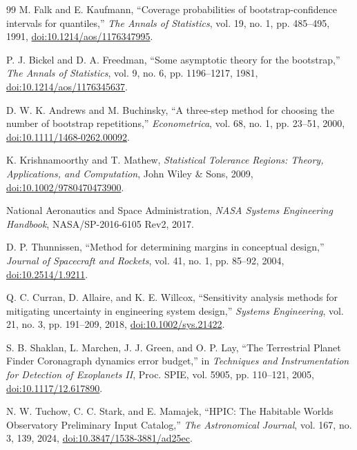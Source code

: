 \documentclass[12pt,a4paper]{article}
\numberwithin{equation}{section}
\numberwithin{figure}{section}
\numberwithin{table}{section}
\begin{document}
\begin{thebibliography}{99}
M. Falk and E. Kaufmann,
``Coverage probabilities of bootstrap-confidence intervals for quantiles,''
\textit{The Annals of Statistics}, vol. 19, no. 1, pp. 485--495, 1991,
\href{https://doi.org/10.1214/aos/1176347995}{doi:10.1214/aos/1176347995}.

P. J. Bickel and D. A. Freedman,
``Some asymptotic theory for the bootstrap,''
\textit{The Annals of Statistics}, vol. 9, no. 6, pp. 1196--1217, 1981,
\href{https://doi.org/10.1214/aos/1176345637}{doi:10.1214/aos/1176345637}.

D. W. K. Andrews and M. Buchinsky,
``A three-step method for choosing the number of bootstrap repetitions,''
\textit{Econometrica}, vol. 68, no. 1, pp. 23--51, 2000,
\href{https://doi.org/10.1111/1468-0262.00092}{doi:10.1111/1468-0262.00092}.

K. Krishnamoorthy and T. Mathew,
\textit{Statistical Tolerance Regions: Theory, Applications, and Computation},
John Wiley \& Sons, 2009,
\href{https://doi.org/10.1002/9780470473900}{doi:10.1002/9780470473900}.

National Aeronautics and Space Administration,
\textit{NASA Systems Engineering Handbook},
NASA/SP-2016-6105 Rev2, 2017.

D. P. Thunnissen,
``Method for determining margins in conceptual design,''
\textit{Journal of Spacecraft and Rockets}, vol. 41, no. 1, pp. 85--92, 2004,
\href{https://doi.org/10.2514/1.9211}{doi:10.2514/1.9211}.

Q. C. Curran, D. Allaire, and K. E. Willcox,
``Sensitivity analysis methods for mitigating uncertainty in engineering system design,''
\textit{Systems Engineering}, vol. 21, no. 3, pp. 191--209, 2018,
\href{https://doi.org/10.1002/sys.21422}{doi:10.1002/sys.21422}.

S. B. Shaklan, L. Marchen, J. J. Green, and O. P. Lay,
``The Terrestrial Planet Finder Coronagraph dynamics error budget,''
in \textit{Techniques and Instrumentation for Detection of Exoplanets II}, Proc. SPIE, vol. 5905, pp. 110--121, 2005,
\href{https://doi.org/10.1117/12.617890}{doi:10.1117/12.617890}.

N. W. Tuchow, C. C. Stark, and E. Mamajek,
``HPIC: The Habitable Worlds Observatory Preliminary Input Catalog,''
\textit{The Astronomical Journal}, vol. 167, no. 3, 139, 2024,
\href{https://doi.org/10.3847/1538-3881/ad25ec}{doi:10.3847/1538-3881/ad25ec}.


\end{thebibliography}
\end{document}
